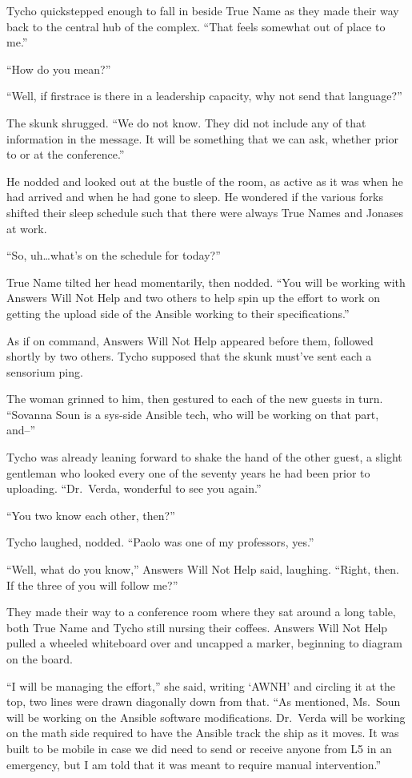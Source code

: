 Tycho quickstepped enough to fall in beside True Name as they made their way back to the central hub of the complex. ``That feels somewhat out of place to me.''

``How do you mean?''

``Well, if firstrace is there in a leadership capacity, why not send that language?''

The skunk shrugged. ``We do not know. They did not include any of that information in the message. It will be something that we can ask, whether prior to or at the conference.''

He nodded and looked out at the bustle of the room, as active as it was when he had arrived and when he had gone to sleep. He wondered if the various forks shifted their sleep schedule such that there were always True Names and Jonases at work.

``So, uh\ldots what's on the schedule for today?''

True Name tilted her head momentarily, then nodded. ``You will be working with Answers Will Not Help and two others to help spin up the effort to work on getting the upload side of the Ansible working to their specifications.''

As if on command, Answers Will Not Help appeared before them, followed shortly by two others. Tycho supposed that the skunk must've sent each a sensorium ping.

The woman grinned to him, then gestured to each of the new guests in turn. ``Sovanna Soun is a sys-side Ansible tech, who will be working on that part, and--''

Tycho was already leaning forward to shake the hand of the other guest, a slight gentleman who looked every one of the seventy years he had been prior to uploading. ``Dr.~Verda, wonderful to see you again.''

``You two know each other, then?''

Tycho laughed, nodded. ``Paolo was one of my professors, yes.''

``Well, what do you know,'' Answers Will Not Help said, laughing. ``Right, then. If the three of you will follow me?''

They made their way to a conference room where they sat around a long table, both True Name and Tycho still nursing their coffees. Answers Will Not Help pulled a wheeled whiteboard over and uncapped a marker, beginning to diagram on the board.

``I will be managing the effort,'' she said, writing `AWNH' and circling it at the top, two lines were drawn diagonally down from that. ``As mentioned, Ms.~Soun will be working on the Ansible software modifications. Dr.~Verda will be working on the math side required to have the Ansible track the ship as it moves. It was built to be mobile in case we did need to send or receive anyone from L5 in an emergency, but I am told that it was meant to require manual intervention.''

